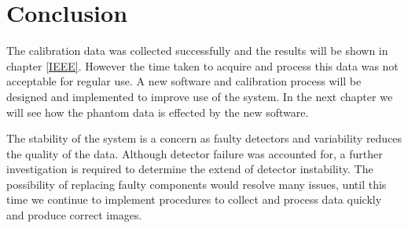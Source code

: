 \section{Conclusion}
The calibration data was collected successfully and the results will be shown in chapter \ref{IEEE}. However the time taken to acquire and process this data was not acceptable for regular use. A new software and calibration process will be designed and implemented to improve use of the system. In the next chapter we will see how the phantom data is effected by the new software.

The stability of the system is a concern as faulty detectors and variability reduces the quality of the data. Although detector failure was accounted for, a further investigation is required to determine the extend of detector instability. The possibility of replacing faulty components would resolve many issues, until this time we continue to implement procedures to collect and process data quickly and  produce correct images.
